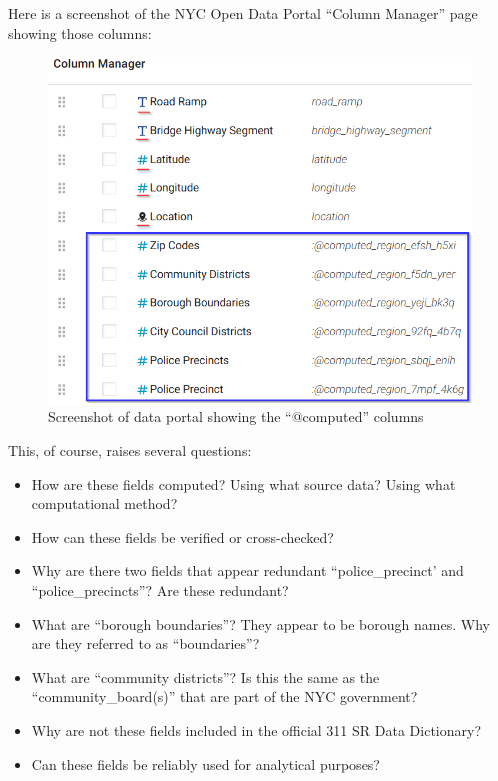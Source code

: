 \documentclass[12pt, titlepage]{article}
\begin{document}
Here is a screenshot of the NYC Open Data Portal ``Column Manager'' page showing those columns:

\begin{figure}[H]
  \centering
	  \includegraphics[scale = 0.65]{computed_columns_screenshot.png}
	  \caption{Screenshot of data portal showing the ``@computed'' columns}
	  \label{fig:computed-columns}
\end{figure}

This, of course, raises several questions:

\begin{itemize}
	\item How are these fields computed? Using what source data? Using what computational method?
	\item How can these fields be verified or cross-checked?
	\item Why are there two fields that appear redundant ``police\_precinct' and ``police\_precincts''? Are these redundant?
	\item What are ``borough boundaries''? They appear to be borough names. Why are they referred to as ``boundaries''?
	\item What are ``community districts''? Is this the same as the ``community\_board(s)'' that are part of the NYC government?
	\item Why are not these fields included in the official 311 SR Data Dictionary?
	\item Can these fields be reliably used for analytical purposes? 
\end{itemize}	
\end{document}
